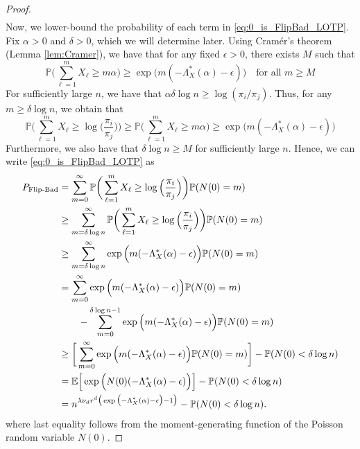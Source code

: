 \documentclass{article}
\renewcommand{\P}{\mathbb{P}}
\newcommand{\E}{\mathbb{E}}
\newcommand{\1}{\mathbbm{1}}
\theoremstyle{definition}
\theoremstyle{plain}
\begin{document}
\begin{proof}
\begin{align}
    \end{align}
    Now, we lower-bound the probability of each term in \eqref{eq:0_is_FlipBad_LOTP}. Fix $\alpha > 0$ and $\delta > 0$, which we will determine later. Using Cram\'er's theorem (Lemma \ref{lem:Cramer}), we have that for any fixed $\epsilon > 0$, there exists $M$ such that 
    \begin{equation*}
    \P\bigg(\sum_{\ell = 1}^m X_\ell \geq m\alpha \bigg) \geq \exp\Big(m(-\Lambda^*_X(\alpha) - \epsilon)\Big) \quad \text{for all } m \geq M
    \end{equation*}
    For sufficiently large $n$, we have that $\alpha \delta \log n \geq \log(\pi_i/\pi_j)$. Thus, for any $m \geq \delta \log n$, we obtain that
    \begin{equation*}
        \P\bigg(\sum_{\ell = 1}^m X_\ell \geq \log\Big(\frac{\pi_i}{\pi_j}\Big)\bigg) \geq \P\bigg(\sum_{\ell = 1}^m X_\ell \geq m\alpha \bigg) \geq \exp\Big(m(-\Lambda^*_X(\alpha) - \epsilon)\Big)
    \end{equation*}
    Furthermore, we also have that $\delta \log n \geq M$ for sufficiently large $n$. Hence, we can write \eqref{eq:0_is_FlipBad_LOTP} as
    \begin{align}
    \label{eq:0_is_FlipBad_simplified} 
        P_\text{Flip-Bad} &= \sum_{m=0}^\infty \P\bigg( \sum_{\ell = 1}^m X_\ell \geq \log\Big(\frac{\pi_i}{\pi_j}\Big)\bigg) \P(N(0) = m) \notag \\
        &\geq \sum_{m=\delta \log n}^\infty \P\bigg( \sum_{\ell = 1}^m X_\ell \geq \log\Big(\frac{\pi_i}{\pi_j}\Big)\bigg) \P(N(0) = m) \notag \\
        &\geq \sum_{m=\delta \log n}^\infty \exp\Big(m(-\Lambda^*_X(\alpha) - \epsilon)\Big) \P(N(0) = m) \notag \\
        &= \sum_{m=0}^\infty \exp\Big(m(-\Lambda^*_X(\alpha) - \epsilon)\Big) \P(N(0) = m) \notag \\
        &\qquad- \sum_{m=0}^{\delta \log n - 1} \exp\Big(m(-\Lambda^*_X(\alpha) - \epsilon)\Big) \P(N(0) = m) \notag \\
        &\geq \bigg[ \sum_{m=0}^\infty \exp\Big(m(-\Lambda^*_X(\alpha) - \epsilon)\Big) \P(N(0) = m) \bigg] - \P(N(0) < \delta \log n) \notag \\
        &= \E\Big[\exp\Big(N(0)(-\Lambda^*_X(\alpha) - \epsilon) \Big)\Big] - \P(N(0) < \delta \log n) \notag \\
        &= n^{\lambda \nu_d r^d \big(\exp\big(-\Lambda^*_X(\alpha) - \epsilon\big) - 1\big)} - \P(N(0) < \delta \log n).
    \end{align}
    where last equality follows from the moment-generating function of the Poisson random variable $N(0)$. 


\end{proof}
\end{document}

